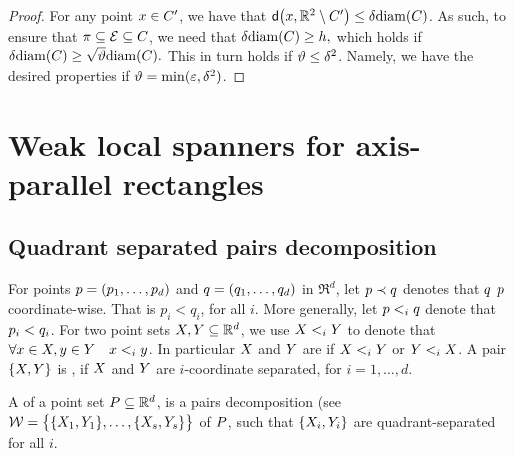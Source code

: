 \documentclass[12pt]{article}%
\begin{document}
\begin{proof}
    For any point $x \in C'$, we have that
    $\dsY{\px}{\Re^2 \setminus \body'} \leq \delta \diamX{\body}$.  As
    such, to ensure that $\pi \subseteq \mathcal{E} \subseteq C$, we need
    that
    \begin{math}
        \delta \diamX{\body} \geq h,
    \end{math}
    which holds if
    \begin{math}
        \delta \diamX{\body} \geq \sqrt{\epsA} \diameterX{\body}.
    \end{math}
    This in turn holds if $\vartheta \leq \delta^2$. Namely, we have the
    desired properties if $\vartheta = \min( \varepsilon, \delta^2)$.
\end{proof}




\section{Weak local spanners for axis-parallel rectangles}

\subsection{Quadrant separated pairs decomposition}

For points $p = (p_1, \ldots, p_d)$ and $q = (q_1, \ldots, q_d)$
in $\Re^d$, let $p \prec q$ denotes that $q$ 
$p$ coordinate-wise. That is $p_i < q_i$, for all $i$. More
generally, let $p <_i q$ denote that $p_i < q_i$. For two
point sets $X, Y \subseteq \mathbb{R}^d$, we use $X <_i Y$ to
denote that $\forall x \in X, y \in Y \quad x <_i y$.
In particular $X$ and $Y$ are 
if $X <_i Y$ or $Y <_i X$. A pair $\{ X, Y\}$ is
, if $X$ and $Y$ are $i$-coordinate
separated, for $i=1,\ldots, d$.

A  of a point set
$P \subseteq \mathbb{R}^d$, is a pairs decomposition (see
$\mathcal{W} = \bigl\{ \{ X_1, Y_1 \}, \ldots, \{ X_s, Y_s \}
\bigr\}$ of $P$, such that $\{ X_i, Y_i\}$ are
quadrant-separated for all $i$.
\end{document}
